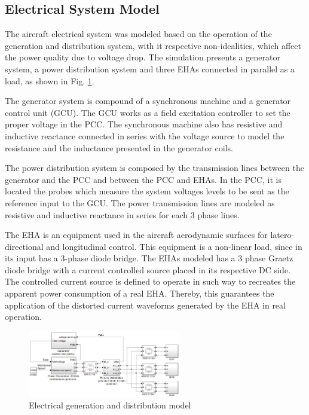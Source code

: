 \subsection{Electrical System Model}

The aircraft electrical system was modeled based on the operation of the generation and distribution system, with it respective non-idealities, which affect the power quality due to voltage drop. The simulation presents a generator system, a power distribution system and three EHAs connected in parallel as a load, as shown in Fig. \ref{fig:simulacao_simulink.png}.

The generator system is compound of a synchronous machine and a generator control unit (GCU). The GCU works as a field excitation controller to set the proper voltage in the PCC. The synchronous machine also has resistive and inductive reactance connected in series with the voltage source to model the resistance and the inductance presented in the generator coils.

The power distribution system is composed by the transmission lines between the generator and the PCC and between the PCC and EHAs. In the PCC, it is located the probes which measure the system voltages levels to be sent as the reference input to the GCU. The power transmission lines are modeled as resistive and inductive reactance in series for each 3 phase lines.

The EHA is an equipment used in the aircraft aerodynamic surfaces for latero-directional and longitudinal control. This equipment is a non-linear load, since in its input has a 3-phase diode bridge. The EHAs modeled has a 3 phase Graetz diode bridge with a current controlled source placed in its respective DC side. The controlled current source is defined to operate in such way to recreates the apparent power consumption of a real EHA. Thereby, this guarantees the application of the distorted current waveforms generated by the EHA in real operation.

\begin{figure}[!tb] %
	\centering
	\includegraphics[width=0.6\textwidth]{Figures/simulacao_simulink.png}
	\caption{Electrical generation and distribution model}
	\label{fig:simulacao_simulink.png}
\end{figure}

